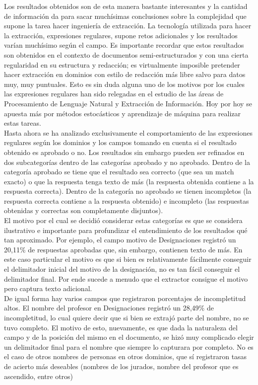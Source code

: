 Los resultados obtenidos son de esta manera bastante interesantes y la cantidad de información da para sacar muchísimas conclusiones sobre la complejidad que supone la tarea hacer ingeniería de extracción. La tecnología utilizada para hacer la extracción, expresiones regulares, supone retos adicionales y los resultados varían muchísimo según el campo. Es importante recordar que estos resultados son obtenidos en el contexto de documentos semi-estructurados y con una cierta regularidad en su estructura y redacción; es virtualmente imposible pretender hacer extracción en dominios con estilo de redacción más libre salvo para datos muy, muy puntuales. Esto es sin duda alguna uno de los motivos por los cuales las expresiones regulares han sido relegadas en el estudio de las áreas de Procesamiento de Lenguaje Natural y Extracción de Información. Hoy por hoy se apuesta más por métodos estocásticos y aprendizaje de máquina para realizar estas tareas. \\

Hasta ahora se ha analizado exclusivamente el comportamiento de las expresiones regulares según los dominios y los campos tomando en cuenta si el resultado obtenido es aprobado o no. Los resultados sin embargo pueden ser refinados en dos subcategorías dentro de las categorías aprobado y no aprobado. Dentro de la categoría aprobado se tiene que el resultado sea correcto (que sea un match exacto) o que la respuesta tenga texto de más (la respuesta obtenida contiene a la respuesta correcta). Dentro de la categoría no aprobado se tienen incompletos (la respuesta correcta contiene a la respuesta obtenido) e incompleto (las respuestas obtenidas y correctas son completamente disjuntos). \\

El motivo por el cual se decidió considerar estas categorías es que se considera ilustrativo e importante para profundizar el entendimiento de los resultados qué tan aproximado. Por ejemplo, el campo motivo de Designaciones registró un 20,11\% de respuestas aprobadas que, sin embargo, contienen texto de más. En este caso particular el motivo es que si bien es relativamente fácilmente conseguir el delimitador inicial del motivo de la designación, no es tan fácil conseguir el delimitador final. Por ende sucede a menudo que el extractor consigue el motivo pero captura texto adicional. \\

De igual forma hay varios campos que registraron porcentajes de incompletitud altos. El nombre del profesor en Designaciones registró un 28,49\% de incompletitud, lo cual quiere decir que si bien se extrajó parte del nombre, no se tuvo completo. El motivo de esto, nuevamente, es que dada la naturaleza del campo y de la posición del mismo en el documento, se hizó muy complicado elegir un delimitador final para el nombre que siempre lo capturara por completo. No es el caso de otros nombres de personas en otros dominios, que sí registraron tasas de acierto más deseables (nombres de los jurados, nombre del profesor que es ascendido, entre otros)\\

